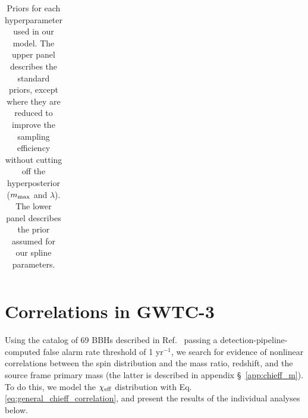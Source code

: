 \begin{refsection}
\begin{table}
\begin{tabular}{|l||ll|}
    \end{tabular}
    \caption{Priors for each hyperparameter used in our model. The upper panel describes the standard priors, except where they are reduced to improve the sampling efficiency without cutting off the hyperposterior ($m_{\rm max}$ and $\lambda$). The lower panel describes the prior assumed for our spline parameters.}
    \label{tab:prior_table}
\end{table}

 
\section{Correlations in \ac{GWTC-3}}
\label{sec: spline GWTC3_results}

Using the catalog of 69 BBHs described in Ref.~\cite{KAGRA:2021duu}  passing a detection-pipeline-computed false alarm rate threshold of 1 yr${}^{-1}$, we search for evidence of nonlinear correlations between the spin distribution and the mass ratio, redshift, and the source frame primary mass (the latter is described in appendix \S~\ref{app:chieff_m}). %
To do this, we model the $\chi_{\rm eff}$ distribution with Eq. \ref{eq:general_chieff_correlation}, and present the results of the individual analyses below.



\end{refsection}
